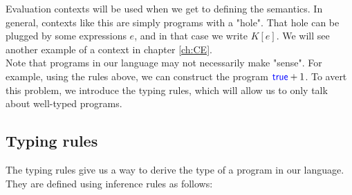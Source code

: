 \documentclass[twoside,11pt,openright]{report}
\theoremstyle{definition}
\newcommand{\Keyword}[1]{{\color{blue} \mathsf{#1}}}
\newcommand{\expr}{e}
\newcommand{\True}{\Keyword{true}}
\newcommand{\elctx}{K}
\begin{document}
Evaluation contexts will be used when we get to defining the semantics. In general, contexts like this are simply programs with a "hole". That hole can be plugged by some expressions $\expr$, and in that case we write $\elctx[\expr]$. We will see another example of a context in chapter \ref{ch:CE}.\\
Note that programs in our language may not necessarily make "sense". For example, using the rules above, we can construct the program $\True + 1$. To avert this problem, we introduce the typing rules, which will allow us to only talk about well-typed programs.

\subsection{Typing rules}
The typing rules give us a way to derive the type of a program in our language. They are defined using inference rules as follows:
\end{document}
